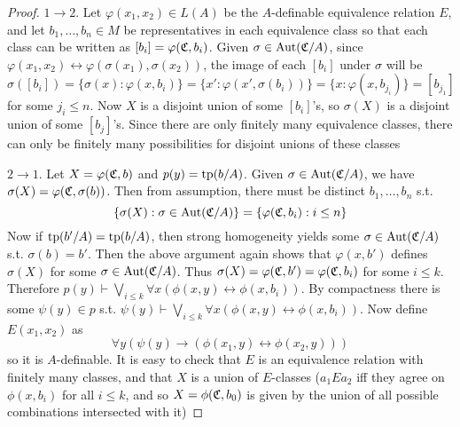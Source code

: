 \documentclass[11pt]{article}
\begin{document}
\begin{proof}
\(1\to 2\). Let \(\varphi(x_1,x_2)\in L(A)\) be the \(A\)-definable equivalence relation \(E\), and
let \(b_1,\dots,b_n\in M\) be representatives in each equivalence class so that each class can be
written as \([b_i]=\varphi(\mathfrak{C},b_i)\). Given \(\sigma\in\operatorname{\text{Aut}}(\mathfrak{C}/A)\), since \(\varphi(x_1,x_2)\leftrightarrow\varphi(\sigma(x_1),\sigma(x_2))\), the image
of each \([b_i]\) under \(\sigma\) will be
\begin{equation*}
\sigma([b_i])=\{\sigma(x):\varphi(x,b_i)\}=\{x':\varphi(x',\sigma(b_i))\}=\{x:\varphi(x,b_{j_i})\}=[b_{j_1}]
\end{equation*}
for some \(j_i\le n\). Now \(X\) is a disjoint union of some \([b_i]\)'s, so \(\sigma(X)\) is a disjoint
union of some \([b_j]\)'s. Since there are only finitely many equivalence classes, there can
only be finitely many possibilities for disjoint unions of these classes

\(2\to 1\). Let \(X=\varphi(\mathfrak{C},b)\) and \(p(y)=\operatorname{tp}(b/A)\). Given \(\sigma\in\operatorname{\text{Aut}}(\mathfrak{C}/A)\), we
have \(\sigma(X)=\varphi(\mathfrak{C},\sigma(b))\). Then from assumption, there must be distinct \(b_1,\dots,b_n\) s.t.
\begin{equation*}
\{\sigma(X):\sigma\in\operatorname{\text{Aut}}(\mathfrak{C}/A)\}=\{\varphi(\mathfrak{C},b_i):i\le n\}
\end{equation*}
Now if \(\operatorname{tp}(b'/A)=\operatorname{tp}(b/A)\), then strong homogeneity yields some \(\sigma\in\operatorname{\text{Aut}}(\mathfrak{C}/A)\)
s.t. \(\sigma(b)=b'\). Then the above argument again shows that \(\varphi(x,b')\) defines \(\sigma(X)\) for
some \(\sigma\in\operatorname{\text{Aut}}(\mathfrak{C}/A)\). Thus \(\sigma(X)=\varphi(\mathfrak{C},b')=\varphi(\mathfrak{C},b_i)\) for some \(i\le k\). Therefore
\(p(y)\vdash\bigvee_{i\le k}\forall x(\phi(x,y)\leftrightarrow\phi(x,b_i))\). By compactness there is
some \(\psi(y)\in p\) s.t. \(\psi(y)\vdash\bigvee_{i\le k}\forall x(\phi(x,y)\leftrightarrow\phi(x,b_i))\). Now define \(E(x_1,x_2)\) as
\begin{equation*}
\forall y(\psi(y)\to(\phi(x_1,y)\leftrightarrow\phi(x_2,y)))
\end{equation*}
so it is \(A\)-definable. It is easy to check that \(E\) is an equivalence relation with
finitely many classes, and that \(X\) is a union of \(E\)-classes (\(a_1Ea_2\) iff they agree on
\(\phi(x,b_i)\) for all \(i\le k\), and so \(X=\phi(\mathfrak{C},b_0)\) is given by the union of all possible
combinations intersected with it)


\end{proof}
\end{document}
